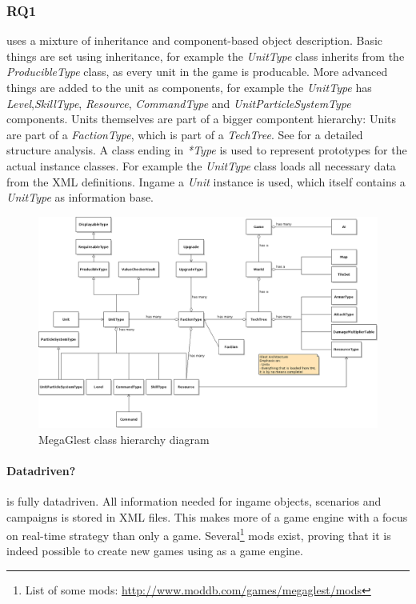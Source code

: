 \subsubsection{RQ1}
\GLEST{} uses a mixture of inheritance and component-based object description. Basic things are set using
inheritance, for example the \textit{UnitType} class inherits from the \textit{ProducibleType} class, as every unit in
the game is producable. More advanced things are added to the unit as components, for example the \textit{UnitType} has
\textit{Level},\textit{SkillType}, \textit{Resource}, \textit{CommandType} and \textit{UnitParticleSystemType}
components. Units themselves are part of a bigger compontent hierarchy: Units are part of a \textit{FactionType}, which
is part of a \textit{TechTree}. See  for a detailed structure analysis. A class ending in
\textit{*Type} is used to represent prototypes for the actual instance classes. For example the \textit{UnitType} class loads all
necessary data from the XML definitions. Ingame a \textit{Unit} instance is used, which itself contains a
\textit{UnitType} as information base.

\begin{figure}[h!]
    \centering
    \includegraphics[angle=90,width=\textwidth]{pics/gamehierarchy}
    \caption{MegaGlest class hierarchy diagram}
    \label{fig:glestclassh}
\end{figure}

\paragraph{Datadriven?}
\GLEST{} is fully datadriven. All information needed for ingame objects, scenarios and campaigns is stored in XML files.
This makes \GLEST{} more of a game engine with a focus on real-time strategy than only a game. Several\footnote{List of
some mods: \url{http://www.moddb.com/games/megaglest/mods}} mods exist, proving that it is indeed possible to create new
games using \GLEST{} as a game engine. 

